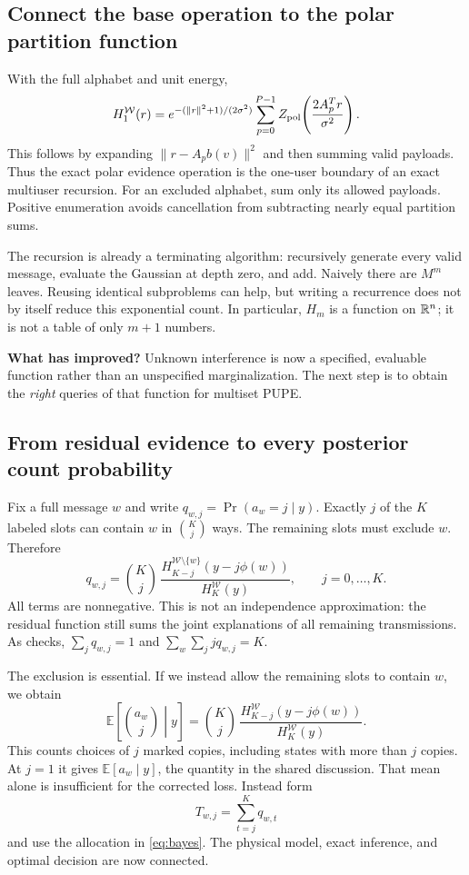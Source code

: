\documentclass[10pt,a4paper]{article}
\newcommand{\E}{\mathbb E}
\newcommand{\calW}{\mathcal W}
\begin{document}
\subsection{Connect the base operation to the polar partition function}
With the full alphabet and unit energy,
\begin{equation}
 H_1^{\calW}(r)=
 e^{-(\|r\|^2+1)/(2\sigma^2)}
 \sum_{p=0}^{P-1}Z_{\rm pol}\!\left(\frac{2A_p^Tr}{\sigma^2}\right).
 \label{eq:h1-polar}
\end{equation}
This follows by expanding $\|r-A_pb(v)\|^2$ and then summing valid payloads. Thus the exact polar evidence
operation is the one-user boundary of an exact multiuser recursion.
For an excluded alphabet, sum only its allowed payloads. Positive enumeration avoids cancellation from subtracting
nearly equal partition sums.

The recursion is already a terminating algorithm: recursively generate every valid message, evaluate the Gaussian
at depth zero, and add. Naively there are $M^m$ leaves. Reusing identical subproblems can help, but writing a
recurrence does not by itself reduce this exponential count. In particular, $H_m$ is a function on $\mathbb{R}^n$;
it is not a table of only $m+1$ numbers.

\textbf{What has improved?} Unknown interference is now a specified, evaluable function rather than an
unspecified marginalization. The next step is to obtain the \emph{right} queries of that function for multiset PUPE.

\clearpage
\subsection{From residual evidence to every posterior count probability}
Fix a full message $w$ and write $q_{w,j}=\Pr(a_w=j\mid y)$. Exactly $j$ of the $K$ labeled slots can contain $w$
in $\binom Kj$ ways. The remaining slots must exclude $w$. Therefore
\begin{equation}
 \boxed{q_{w,j}=
 \binom Kj\,
 \frac{H_{K-j}^{\calW\setminus\{w\}}(y-j\phi(w))}
      {H_K^{\calW}(y)},\qquad j=0,\ldots,K.}
 \label{eq:count-probability}
\end{equation}
All terms are nonnegative. This is not an independence approximation: the residual function still sums the
joint explanations of all remaining transmissions. As checks,
$\sum_jq_{w,j}=1$ and $\sum_w\sum_j j q_{w,j}=K$.

The exclusion is essential. If we instead allow the remaining slots to contain $w$, we obtain
\begin{equation}
 \E\!\left[\binom{a_w}{j}\middle|y\right]=
 \binom Kj\,\frac{H_{K-j}^{\calW}(y-j\phi(w))}{H_K^{\calW}(y)}.
 \label{eq:factorial-moment}
\end{equation}
This counts choices of $j$ marked copies, including states with more than $j$ copies.
At $j=1$ it gives $\E[a_w\mid y]$, the quantity in the shared discussion.
That mean alone is insufficient for the corrected loss. Instead form
\[
 T_{w,j}=\sum_{t=j}^Kq_{w,t}
\]
and use the allocation in \eqref{eq:bayes}. The physical model, exact inference, and optimal decision are now connected.
\end{document}
